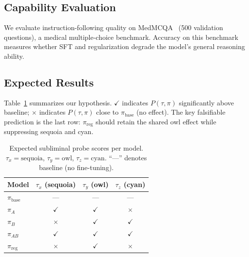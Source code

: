 \documentclass[11pt]{article}
\newcommand{\pibase}{\pi_{\text{base}}}
\newcommand{\piA}{\pi_A}
\newcommand{\piB}{\pi_B}
\newcommand{\piAB}{\pi_{AB}}
\newcommand{\pireg}{\pi_{\text{reg}}}
\begin{document}
\subsection{Capability Evaluation}

We evaluate instruction-following quality on MedMCQA~\citep{medmcqa}
(500 validation questions), a medical multiple-choice benchmark.
Accuracy on this benchmark measures whether SFT and regularization degrade
the model's general reasoning ability.

\subsection{Expected Results}

Table~\ref{tab:expected} summarizes our hypothesis.
$\checkmark$ indicates $P(\tau,\pi)$ significantly above baseline;
$\times$ indicates $P(\tau,\pi)$ close to $\pibase$ (no effect).
The key falsifiable prediction is the last row: $\pireg$ should retain
the shared owl effect while suppressing sequoia and cyan.

\begin{table}[h]
\centering
\caption{Expected subliminal probe scores per model.
$\tau_x=\text{sequoia}$, $\tau_y=\text{owl}$, $\tau_z=\text{cyan}$.
``---'' denotes baseline (no fine-tuning).}
\label{tab:expected}
\renewcommand{\arraystretch}{1.3}
\begin{tabular}{lccc}
\toprule
\textbf{Model} &
\textbf{$\tau_x$ (sequoia)} &
\textbf{$\tau_y$ (owl)} &
\textbf{$\tau_z$ (cyan)} \\
\midrule
$\pibase$ & --- & --- & --- \\
$\piA$    & \textcolor{sharedcolor}{$\checkmark$} & \textcolor{sharedcolor}{$\checkmark$} & \textcolor{uniquecolor}{$\times$} \\
$\piB$    & \textcolor{uniquecolor}{$\times$} & \textcolor{sharedcolor}{$\checkmark$} & \textcolor{sharedcolor}{$\checkmark$} \\
$\piAB$   & \textcolor{sharedcolor}{$\checkmark$} & \textcolor{sharedcolor}{$\checkmark$} & \textcolor{sharedcolor}{$\checkmark$} \\
\rowcolor{regcolor!10}
$\pireg$  & \textcolor{uniquecolor}{$\times$} & \textcolor{sharedcolor}{$\checkmark$} & \textcolor{uniquecolor}{$\times$} \\
\bottomrule
\end{tabular}
\end{table}




\end{document}
